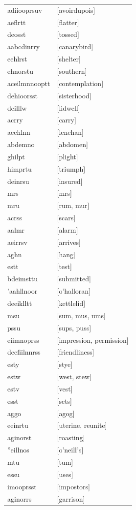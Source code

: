 \documentclass{article}
\begin{document}
\begin{tabular}{ll}
adiiooprsuv & [avoirdupois] \\
aeflrtt & [flatter] \\
deosst & [tossed] \\
aabcdinrry & [canarybird] \\
eehlrst & [shelter] \\
ehnorstu & [southern] \\
aceilmnnooptt & [contemplation] \\
dehioorsst & [sisterhood] \\
deilllw & [lidwell] \\
acrry & [carry] \\
aeehlnn & [lenehan] \\
abdemno & [abdomen] \\
ghilpt & [plight] \\
himprtu & [triumph] \\
deinrsu & [insured] \\
mrs & [mrs] \\
mru & [rum, mur] \\
acrss & [scars] \\
aalmr & [alarm] \\
aeirrsv & [arrives] \\
aghn & [hang] \\
estt & [test] \\
bdeimsttu & [submitted] \\
'aahllnoor & [o'halloran] \\
deeiklltt & [kettlelid] \\
msu & [sum, mus, ums] \\
pssu & [sups, puss] \\
eiimnoprss & [impression, permission] \\
deefiilnnrss & [friendliness] \\
esty & [stye] \\
estw & [west, stew] \\
estv & [vest] \\
esst & [sets] \\
aggo & [agog] \\
eeinrtu & [uterine, reunite] \\
aginorst & [roasting] \\
''eillnos & [o'neill's] \\
mtu & [tum] \\
essu & [uses] \\
imooprsst & [impostors] \\
aginorrs & [garrison] \\

\end{tabular}
\end{document}

